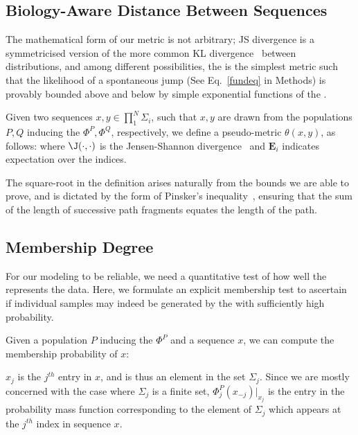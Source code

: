 {\subsection*{Biology-Aware Distance Between Sequences}
The mathematical form of our metric is not arbitrary; JS divergence is a symmetricised version of the more common KL divergence~\cite{cover} between distributions, and among  different possibilities, the \qdist  is the simplest metric such that the likelihood of a spontaneous jump (See Eq.~\eqref{fundeq} in Methods) is provably bounded above and below  by simple exponential functions of the \qdist.

\begin{defn}\label{defqdistance}
Given two sequences $x,y \in \prod_1^N\Sigma_i$, such that $x,y$ are drawn from the  populations $P,Q$  inducing the \tnet $\Phi^P,\Phi^Q$, respectively,  we define a pseudo-metric $\theta(x,y) $, as follows:
where $ \J(\cdot,\cdot)$ is the Jensen-Shannon divergence~\cite{manning1999foundations} and $\mathbf{E}_i$ indicates expectation over the indices.
\end{defn}
The square-root in the definition arises naturally from the bounds we are able to prove, and is dictated by the form of Pinsker's inequality~\cite{cover}, ensuring that   the sum of the length of successive path fragments equates the length of the path.%


\subsection*{Membership Degree}

For our modeling to be reliable, we need a quantitative test of how well the \tnet represents the data. Here, we formulate an explicit membership test to ascertain if individual samples may indeed be generated by the \tnet with sufficiently high probability.
%
\begin{defn}\label{defmem}
Given a population $P$ inducing the \tnet $\Phi^P$ and a sequence $x$, we can compute the membership probability of $x$:
\end{defn}
$x_j$ is the $j^{th}$ entry in $x$, and is thus an element in the set $\Sigma_j$. Since we are mostly concerned with the case where $\Sigma_j$ is a finite set, $\Phi^P_j(x_{-j}) \vert_{x_j}$ is the entry in the probability mass function corresponding to the element of $\Sigma_j$ which appears at the  $j^{th}$ index in sequence $x$. 
 
}

